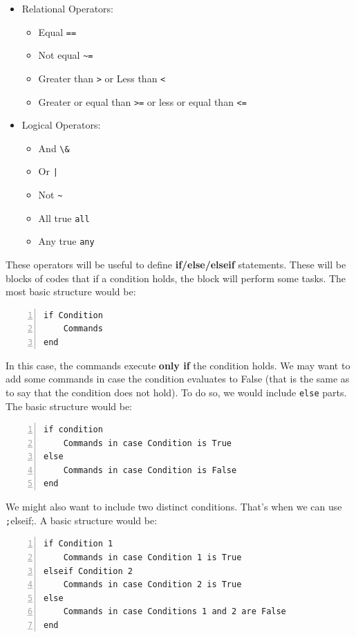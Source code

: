 \documentclass[a4paper,11pt]{article}
\begin{document}
\begin{itemize}
	\item Relational Operators:
	\begin{itemize}
		\item Equal \verb;==;
		\item Not equal \verb;~=;
		\item Greater than \verb;>; or Less than \verb;<;
		\item Greater or equal than \verb;>=; or less or equal than \verb;<=;
	\end{itemize}
	\item Logical Operators:
	\begin{itemize}
		\item And \verb;\&;
		\item Or \verb;|;
		\item Not \verb;~;
		\item All true \verb;all;
		\item Any true \verb;any;
	\end{itemize}
\end{itemize}

These operators will be useful to define \textbf{if/else/elseif} statements. These will be blocks of codes that if a condition holds, the block will perform some tasks. The most basic structure would be:

\begin{Verbatim}[numbers=left]
if Condition
	Commands
end
\end{Verbatim}

In this case, the commands execute \textbf{only if} the condition holds. We may want to add some commands in case the condition evaluates to False (that is the same as to say that the condition does not hold). To do so, we would include \verb;else; parts. The basic structure would be:

\begin{Verbatim}[numbers=left]
if condition
	Commands in case Condition is True
else
	Commands in case Condition is False
end	
\end{Verbatim}

We might also want to include two distinct conditions. That's when we can use \texttt;elseif;. A basic structure would be:

\begin{Verbatim}[numbers=left]
if Condition 1
	Commands in case Condition 1 is True
elseif Condition 2
	Commands in case Condition 2 is True
else
	Commands in case Conditions 1 and 2 are False
end
\end{Verbatim}
\end{document}
